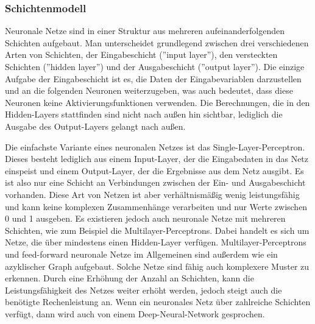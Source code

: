 \subsubsection{Schichtenmodell}\label{subsec:neuronen:schichtenmodell}
Neuronale Netze sind in einer Struktur aus mehreren aufeinanderfolgenden Schichten aufgebaut.
Man unterscheidet grundlegend zwischen drei verschiedenen Arten von Schichten, der Eingabeschicht (''input layer''), den versteckten Schichten (''hidden layer'') und der Ausgabeschicht (''output layer'').
Die einzige Aufgabe der Eingabeschicht ist es, die Daten der Eingabevariablen darzustellen und an die folgenden Neuronen weiterzugeben, was auch bedeutet, dass diese Neuronen keine Aktivierungsfunktionen verwenden.
Die Berechnungen, die in den Hidden-Layers stattfinden sind nicht nach außen hin sichtbar, lediglich die Ausgabe des Output-Layers gelangt nach außen.

\bigbreak\noindent
Die einfachste Variante eines neuronalen Netzes ist das Single-Layer-Perceptron. Dieses besteht lediglich aus einem Input-Layer, der die Eingabedaten in das Netz einspeist und einem Output-Layer, der die Ergebnisse aus dem Netz ausgibt.
Es ist also nur eine Schicht an Verbindungen zwischen der Ein- und Ausgabeschicht vorhanden.
Diese Art von Netzen ist aber verhältnismäßig wenig leistungsfähig und kann keine komplexen Zusammenhänge verarbeiten und nur Werte zwischen 0 und 1 ausgeben.
Es existieren jedoch auch neuronale Netze mit mehreren Schichten, wie zum Beispiel die Multilayer-Perceptrons. Dabei handelt es sich um Netze, die über mindestens einen Hidden-Layer verfügen.
Multilayer-Perceptrons und feed-forward neuronale Netze im Allgemeinen sind außerdem wie ein azyklischer Graph aufgebaut.
Solche Netze sind fähig auch komplexere Muster zu erkennen.
Durch eine Erhöhung der Anzahl an Schichten, kann die Leistungsfähigkeit des Netzes weiter erhöht werden, jedoch steigt auch die benötigte Rechenleistung an.
Wenn ein neuronales Netz über zahlreiche Schichten verfügt, dann wird auch von einem Deep-Neural-Network gesprochen.